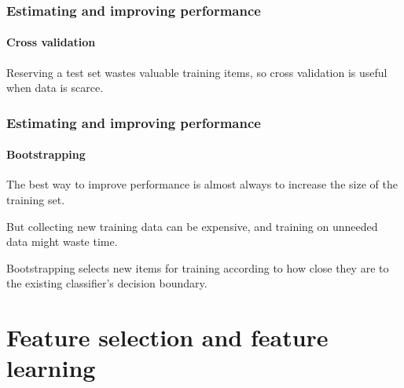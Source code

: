 \documentclass[aspectratio=169]{beamer}
\begin{document}
\begin{frame}
\frametitle{Estimating and improving performance}
\framesubtitle{Cross validation}

Reserving a test set wastes valuable training items, so
\alert{cross validation} is useful when data is scarce.

\end{frame}

\begin{frame}
\frametitle{Estimating and improving performance}
\framesubtitle{Bootstrapping}

The best way to improve performance is almost always to
\alert{increase the size of the training set}.

\medskip

But collecting \alert{new training data} can be \alert{expensive}, and
training on unneeded data might waste time.

\medskip

\alert{Bootstrapping} selects new items for training according to
\alert{how close} they are to the \alert{existing classifier's}
decision boundary.

\end{frame}

\section{Feature selection and feature learning}
\end{document}

